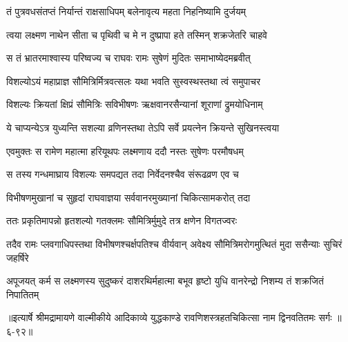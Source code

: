 \twolineshloka
{तं पुत्रवधसंतप्तं निर्यान्तं राक्षसाधिपम्}
{बलेनावृत्य महता निहनिष्यामि दुर्जयम्} %

\twolineshloka
{त्वया लक्ष्मण नाथेन सीता च पृथिवी च मे}
{न दुष्प्रापा हते तस्मिन् शक्रजेतरि चाहवे} %

\twolineshloka
{स तं भ्रातरमाश्वास्य परिष्वज्य च राघवः}
{रामः सुषेणं मुदितः समाभाष्येदमब्रवीत्} %

\twolineshloka
{विशल्योऽयं महाप्राज्ञ सौमित्रिर्मित्रवत्सलः}
{यथा भवति सुस्वस्थस्तथा त्वं समुपाचर} %

\twolineshloka
{विशल्यः क्रियतां क्षिप्रं सौमित्रिः सविभीषणः}
{ऋक्षवानरसैन्यानां शूराणां द्रुमयोधिनाम्} %

\twolineshloka
{ये चाप्यन्येऽत्र युध्यन्ति सशल्या व्रणिनस्तथा}
{तेऽपि सर्वे प्रयत्नेन क्रियन्ते सुखिनस्त्वया} %

\twolineshloka
{एवमुक्तः स रामेण महात्मा हरियूथपः}
{लक्ष्मणाय ददौ नस्तः सुषेणः परमौषधम्} %

\twolineshloka
{स तस्य गन्धमाघ्राय विशल्यः समपद्यत}
{तदा निर्वेदनश्चैव संरूढव्रण एव च} %

\twolineshloka
{विभीषणमुखानां च सुहृदां राघवाज्ञया}
{सर्ववानरमुख्यानां चिकित्सामकरोत् तदा} %

\twolineshloka
{ततः प्रकृतिमापन्नो हृतशल्यो गतक्लमः}
{सौमित्रिर्मुमुदे तत्र क्षणेन विगतज्वरः} %

\twolineshloka
{तदैव रामः प्लवगाधिपस्तथा विभीषणश्चर्क्षपतिश्च वीर्यवान्}
{अवेक्ष्य सौमित्रिमरोगमुत्थितं मुदा ससैन्याः सुचिरं जहर्षिरे} %

\twolineshloka
{अपूजयत् कर्म स लक्ष्मणस्य सुदुष्करं दाशरथिर्महात्मा}
{बभूव हृष्टो युधि वानरेन्द्रो निशम्य तं शक्रजितं निपातितम्} %


॥इत्यार्षे श्रीमद्रामायणे वाल्मीकीये आदिकाव्ये युद्धकाण्डे रावणिशस्त्रहतचिकित्सा नाम द्विनवतितमः सर्गः ॥६-९२॥
